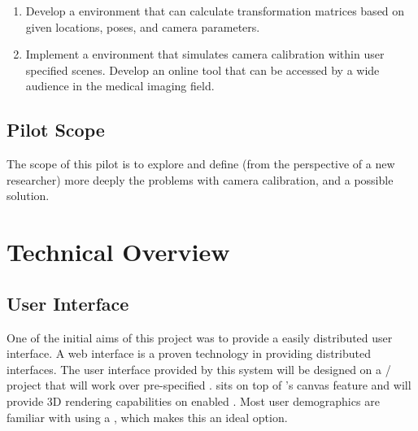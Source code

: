 \documentclass[11pt]{report}
\begin{document}
\begin{enumerate}
\item Develop a  environment that can calculate transformation matrices based on given locations, poses, and camera parameters.  
\item Implement a  environment that simulates camera calibration within user specified scenes. Develop an online tool that can be accessed by a wide audience in the medical imaging field.
\end{enumerate}

\subsection{Pilot Scope}
The scope of this pilot is to explore and define (from the perspective of a new researcher) more deeply the problems with camera calibration, and a possible solution.  

\section{Technical Overview}

\subsection{User Interface}




One of the initial aims of this project was to provide a easily distributed user interface. A web interface is a proven technology in providing distributed interfaces. The user interface provided by this system will be designed on a / project that will work over pre-specified .  sits on top of 's canvas feature and will provide 3D rendering capabilities on enabled . Most user demographics are familiar with using a , which makes this an ideal option. 
\end{document}
